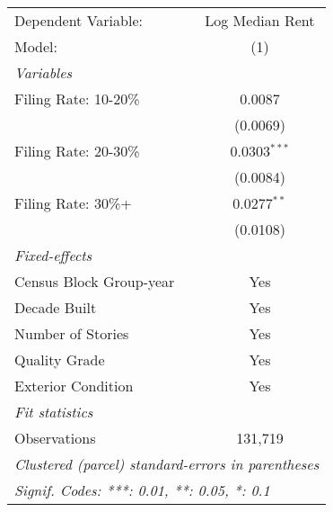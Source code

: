 \begingroup
\centering
\begin{tabular}{lc}
   \tabularnewline \midrule \midrule
   Dependent Variable:     & Log Median Rent\\  
   Model:                  & (1)\\  
   \midrule
   \emph{Variables}\\
   Filing Rate: 10-20\%    & 0.0087\\   
                           & (0.0069)\\   
   Filing Rate: 20-30\%    & 0.0303$^{***}$\\   
                           & (0.0084)\\   
   Filing Rate: 30\%+      & 0.0277$^{**}$\\   
                           & (0.0108)\\   
   \midrule
   \emph{Fixed-effects}\\
   Census Block Group-year & Yes\\  
   Decade Built            & Yes\\  
   Number of Stories       & Yes\\  
   Quality Grade           & Yes\\  
   Exterior Condition      & Yes\\  
   \midrule
   \emph{Fit statistics}\\
   Observations            & 131,719\\  
   \midrule \midrule
   \multicolumn{2}{l}{\emph{Clustered (parcel) standard-errors in parentheses}}\\
   \multicolumn{2}{l}{\emph{Signif. Codes: ***: 0.01, **: 0.05, *: 0.1}}\\
\end{tabular}
\par\endgroup
